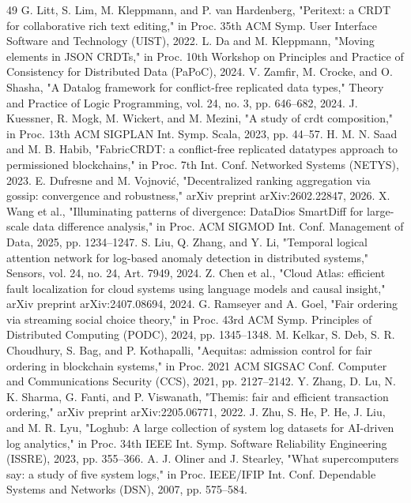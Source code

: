 \documentclass[11pt]{article}
\begin{document}
\begin{thebibliography}{49}
 G. Litt, S. Lim, M. Kleppmann, and P. van Hardenberg, "Peritext: a CRDT for collaborative rich text editing," in Proc. 35th ACM Symp. User Interface Software and Technology (UIST), 2022.
 L. Da and M. Kleppmann, "Moving elements in JSON CRDTs," in Proc. 10th Workshop on Principles and Practice of Consistency for Distributed Data (PaPoC), 2024.
 V. Zamfir, M. Crocke, and O. Shasha, "A Datalog framework for conflict-free replicated data types," Theory and Practice of Logic Programming, vol. 24, no. 3, pp. 646–682, 2024.
 J. Kuessner, R. Mogk, M. Wickert, and M. Mezini, "A study of crdt composition," in Proc. 13th ACM SIGPLAN Int. Symp. Scala, 2023, pp. 44–57.
 H. M. N. Saad and M. B. Habib, "FabricCRDT: a conflict-free replicated datatypes approach to permissioned blockchains," in Proc. 7th Int. Conf. Networked Systems (NETYS), 2023.
 E. Dufresne and M. Vojnović, "Decentralized ranking aggregation via gossip: convergence and robustness," arXiv preprint arXiv:2602.22847, 2026.
 X. Wang et al., "Illuminating patterns of divergence: DataDios SmartDiff for large-scale data difference analysis," in Proc. ACM SIGMOD Int. Conf. Management of Data, 2025, pp. 1234–1247.
 S. Liu, Q. Zhang, and Y. Li, "Temporal logical attention network for log-based anomaly detection in distributed systems," Sensors, vol. 24, no. 24, Art. 7949, 2024.
 Z. Chen et al., "Cloud Atlas: efficient fault localization for cloud systems using language models and causal insight," arXiv preprint arXiv:2407.08694, 2024.
 G. Ramseyer and A. Goel, "Fair ordering via streaming social choice theory," in Proc. 43rd ACM Symp. Principles of Distributed Computing (PODC), 2024, pp. 1345–1348.
 M. Kelkar, S. Deb, S. R. Choudhury, S. Bag, and P. Kothapalli, "Aequitas: admission control for fair ordering in blockchain systems," in Proc. 2021 ACM SIGSAC Conf. Computer and Communications Security (CCS), 2021, pp. 2127–2142.
 Y. Zhang, D. Lu, N. K. Sharma, G. Fanti, and P. Viswanath, "Themis: fair and efficient transaction ordering," arXiv preprint arXiv:2205.06771, 2022.
 J. Zhu, S. He, P. He, J. Liu, and M. R. Lyu, "Loghub: A large collection of system log datasets for AI-driven log analytics," in Proc. 34th IEEE Int. Symp. Software Reliability Engineering (ISSRE), 2023, pp. 355–366.
 A. J. Oliner and J. Stearley, "What supercomputers say: a study of five system logs," in Proc. IEEE/IFIP Int. Conf. Dependable Systems and Networks (DSN), 2007, pp. 575–584.

\end{thebibliography}
\end{document}
